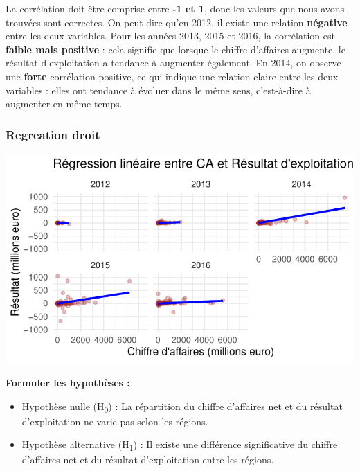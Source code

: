 \documentclass[mstat,12pt]{unswthesis}
\begin{document}
\medskip

La corrélation doit être comprise entre \textbf{-1 et 1}, donc les
valeurs que nous avons trouvées sont correctes. On peut dire qu'en 2012,
il existe une relation \textbf{négative} entre les deux variables. Pour
les années 2013, 2015 et 2016, la corrélation est \textbf{faible mais
positive} : cela signifie que lorsque le chiffre d'affaires augmente, le
résultat d'exploitation a tendance à augmenter également. En 2014, on
observe une \textbf{forte} corrélation positive, ce qui indique une
relation claire entre les deux variables : elles ont tendance à évoluer
dans le même sens, c'est-à-dire à augmenter en même temps.

\newpage

\subsubsection{Regreation droit}\label{regreation-droit}

\includegraphics{TDDT_projet_L_2_files/figure-latex/reg_droit-1.pdf}

\medskip

\textbf{Formuler les hypothèses :}

\bigskip

\begin{itemize}
\tightlist
\item
  Hypothèse nulle (H\textsubscript{0}) : La répartition du chiffre
  d'affaires net et du résultat d'exploitation ne varie pas selon les
  régions. \medskip
\item
  Hypothèse alternative (H\textsubscript{1}) : Il existe une différence
  significative du chiffre d'affaires net et du résultat d'exploitation
  entre les régions.
\end{itemize}
\end{document}
